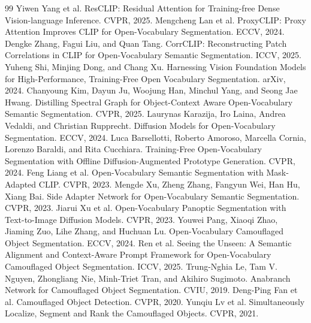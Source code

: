 \documentclass[11pt,a4paper]{article}
\begin{document}
\begin{thebibliography}{99}
 Yiwen Yang et al. ResCLIP: Residual Attention for Training-free Dense Vision-language Inference. CVPR, 2025.
 Mengcheng Lan et al. ProxyCLIP: Proxy Attention Improves CLIP for Open-Vocabulary Segmentation. ECCV, 2024.
 Dengke Zhang, Fagui Liu, and Quan Tang. CorrCLIP: Reconstructing Patch Correlations in CLIP for Open-Vocabulary Semantic Segmentation. ICCV, 2025.
 Yuheng Shi, Minjing Dong, and Chang Xu. Harnessing Vision Foundation Models for High-Performance, Training-Free Open Vocabulary Segmentation. arXiv, 2024.
 Chanyoung Kim, Dayun Ju, Woojung Han, Minchul Yang, and Seong Jae Hwang. Distilling Spectral Graph for Object-Context Aware Open-Vocabulary Semantic Segmentation. CVPR, 2025.
 Laurynas Karazija, Iro Laina, Andrea Vedaldi, and Christian Rupprecht. Diffusion Models for Open-Vocabulary Segmentation. ECCV, 2024.
 Luca Barsellotti, Roberto Amoroso, Marcella Cornia, Lorenzo Baraldi, and Rita Cucchiara. Training-Free Open-Vocabulary Segmentation with Offline Diffusion-Augmented Prototype Generation. CVPR, 2024.
 Feng Liang et al. Open-Vocabulary Semantic Segmentation with Mask-Adapted CLIP. CVPR, 2023.
 Mengde Xu, Zheng Zhang, Fangyun Wei, Han Hu, Xiang Bai. Side Adapter Network for Open-Vocabulary Semantic Segmentation. CVPR, 2023.
 Jiarui Xu et al. Open-Vocabulary Panoptic Segmentation with Text-to-Image Diffusion Models. CVPR, 2023.
 Youwei Pang, Xiaoqi Zhao, Jiaming Zuo, Lihe Zhang, and Huchuan Lu. Open-Vocabulary Camouflaged Object Segmentation. ECCV, 2024.
 Ren et al. Seeing the Unseen: A Semantic Alignment and Context-Aware Prompt Framework for Open-Vocabulary Camouflaged Object Segmentation. ICCV, 2025.
 Trung-Nghia Le, Tam V. Nguyen, Zhongliang Nie, Minh-Triet Tran, and Akihiro Sugimoto. Anabranch Network for Camouflaged Object Segmentation. CVIU, 2019.
 Deng-Ping Fan et al. Camouflaged Object Detection. CVPR, 2020.
 Yunqiu Lv et al. Simultaneously Localize, Segment and Rank the Camouflaged Objects. CVPR, 2021.
\end{thebibliography}
\end{document}
